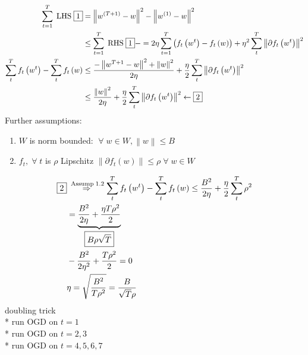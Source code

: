\documentclass{article}
\begin{document}
\begin{align*}
\displaystyle\sum_{t=1}^{T} \text{\;LHS\;} \boxed{1} &= \left\|w^{\left(T+1\right)} - w\right\|^{2} - \left\|w^{\left(1\right)} - w\right\|^{2}
\\ &\leq  \displaystyle\sum_{t=1}^{T} \text{\;RHS\;} \boxed{1} -= 2 \eta \displaystyle\sum_{t=1}^{T} \left(f_{t}\left(w^{t}\right) - f_{t}\left(w\right)\right) + \eta^{2} \displaystyle\sum_{t}^{T} \left\|\partial f_{t}\left(w^{t}\right)\right\|^{2}
\\ \displaystyle\sum_{t}^{T} f_{t}\left(w^{t}\right) - \displaystyle\sum_{t}^{T} f_{t}\left(w\right) &\leq  \dfrac{-\left\|w^{T+1} - w\right\|^{2} + \left\|w\right\|^{2}}{2 \eta} + \dfrac{\eta}{2} \displaystyle\sum_{t}^{T} \left\|\partial f_{t}\left(w^{t}\right)\right\|^{2}
\\ &\leq  \dfrac{\left\|w\right\|^{2}}{2 \eta} + \dfrac{\eta}{2} \displaystyle\sum_{t}^{T} \left\|\partial f_{t}\left(w^{t}\right)\right\|^{2} \leftarrow \boxed{2}
\end{align*}
Further assumptions:
\begin{enumerate}
\item $W $ is norm bounded: $\;\forall\; w \in W, \left\|w\right\| \leq  B $
\item $f_{t}, \;\forall\; t $ is $\rho$ Lipschitz $\left\|\partial f_{t}\left(w\right)\right\| \leq  \rho \;\forall\; w \in W $
\end{enumerate}

\begin{align*}
\boxed{2} &\stackrel{\text{\;Assump\;} 1.2}{\Rightarrow} \displaystyle\sum_{t}^{T} f_{t}\left(w^{t}\right) - \displaystyle\sum_{t}^{T} f_{t}\left(w\right) \leq  \dfrac{B^{2}}{2 \eta} + \dfrac{\eta}{2} \displaystyle\sum_{t}^{T} \rho^{2}
\\ &= \underbrace{\dfrac{B^{2}}{2 \eta} + \dfrac{\eta T \rho^{2}}{2} }_{\boxed{B \rho \sqrt{T}}}
\\ &  - \dfrac{B^{2}}{2 \eta^{2}} + \dfrac{T \rho^{2}}{2} = 0
\\ &  \eta = \sqrt{\dfrac{B^{2}}{T \rho^{2}}} = \dfrac{B}{\sqrt{T} \rho}
\end{align*}
doubling trick
\\* run OGD on $t  = 1$
\\* run OGD on $t  = 2, 3$
\\* run OGD on $t  = 4, 5, 6, 7$
\newline \newline
\end{document}
